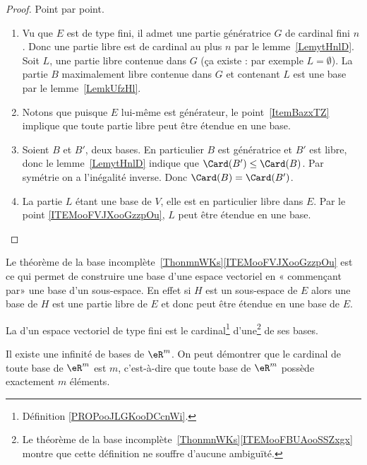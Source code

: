 \begin{proof}
	Point par point.
	\begin{enumerate}
		\item
		      Vu que \( E\) est de type fini, il admet une partie génératrice \( G\) de cardinal fini \( n\). Donc une partie libre est de cardinal au plus \( n\) par le lemme~\ref{LemytHnlD}. Soit \( L\), une partie libre contenue dans \( G\) (ça existe : par exemple \( L=\emptyset\)). La partie \( B\) maximalement libre contenue dans \( G\) et contenant \( L\) est une base par le lemme~\ref{LemkUfzHl}.
		\item
		      Notons que puisque \( E\) lui-même est générateur, le point~\ref{ItemBazxTZ} implique que toute partie libre peut être étendue en une base.
		\item
		      Soient \( B\) et \( B'\), deux bases. En particulier \( B\) est génératrice et \( B'\) est libre, donc le lemme~\ref{LemytHnlD} indique que \( \Card(B')\leq \Card(B)\). Par symétrie on a l'inégalité inverse. Donc \( \Card(B)=\Card(B')\).
		\item
		      La partie \( L\) étant une base de \( V\), elle est en particulier libre dans \( E\). Par le point \ref{ITEMooFVJXooGzzpOu}, \( L\) peut être étendue en une base.
	\end{enumerate}
\end{proof}

\begin{remark}      \label{REMooYGJEooEcZQKa}
	Le théorème de la base incomplète~\ref{ThonmnWKs}\ref{ITEMooFVJXooGzzpOu} est ce qui permet de construire une base d'une espace vectoriel en « commençant par» une base d'un sous-espace. En effet si \( H\) est un sous-espace de \( E\) alors une base de \( H\) est une partie libre de \( E\) et donc peut être étendue en une base de \( E\).
\end{remark}

\begin{definition}      \label{DEFooWRLKooArTpgh}
	La  d'un espace vectoriel de type fini est le cardinal\footnote{Définition \ref{PROPooJLGKooDCcnWi}.} d'une\footnote{Le théorème de la base incomplète~\ref{ThonmnWKs}\ref{ITEMooFBUAooSSZxgx} montre que cette définition ne souffre d'aucune ambiguïté.} de ses bases.
\end{definition}

Il existe une infinité de bases de $\eR^m$. On peut démontrer que le cardinal de toute base de $\eR^m$ est $m$, c'est-à-dire que toute base de $\eR^m$ possède exactement $m$ éléments.

